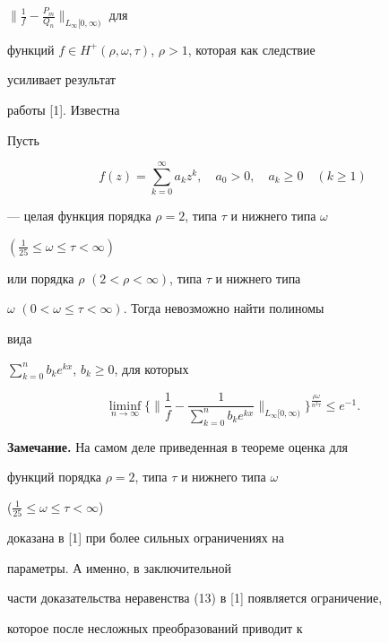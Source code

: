 $\big\|\frac{1}{f}-\frac{P_m}{Q_n}\big\|_{L_\infty[0,\infty)}$ для 


функций $f\in H^+(\rho,\omega,\tau)$, $\rho>1$, которая как следствие 


усиливает результат 


работы [1]. Известна  


 


\begin{thm} Пусть 


$$ 


f(z)=\sum^\infty_{k=0}a_k z^k,\quad a_0>0,\quad 


a_k\ge 0\quad (k\ge 1) 


$$ 


--- целая функция порядка $\rho=2$, типа $\tau$ и нижнего типа $\omega$ 


$(\frac{1}{25}\le\omega\le\tau<\infty)$ 


или порядка $\rho$ $(2<\rho<\infty)$, типа $\tau$ и нижнего типа 


$\omega$ $(0<\omega\le\tau<\infty)$. Тогда невозможно найти полиномы 


вида 


$\sum\limits^n_{k=0}b_k e^{kx}$, $b_k\ge 0$, для которых 


$$ 


\liminf_{n\to\infty}\bigg\{\bigg\|\frac{1}{f}- 


\frac{1}{\sum\limits^n_{k=0}b_k e^{kx}} 


\bigg\|_{L_\infty[0,\infty)}\bigg\}^{\frac{\rho\omega}{n^2\tau}} 


\le e^{-1}. 


$$ 


\end{thm} 


 


{\bf Замечание.} На самом деле приведенная в теореме оценка для  


функций порядка $\rho=2$, типа $\tau$ и нижнего типа $\omega$ 


($\frac{1}{25}\le\omega\le\tau<\infty$) 


доказана в [1] при более сильных ограничениях на 


параметры. А именно, в заключительной 


части доказательства неравенства (13) в [1] появляется ограничение, 


которое после несложных преобразований приводит к 


